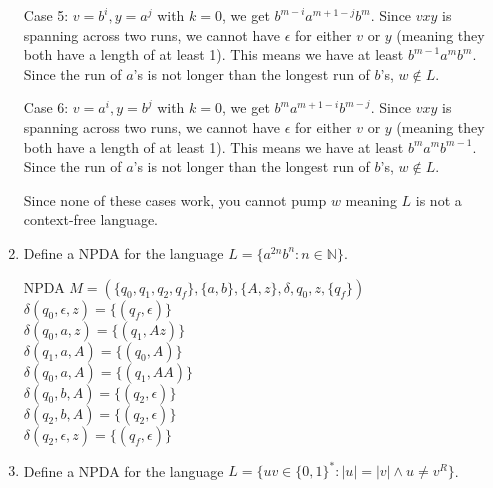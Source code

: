 \documentclass[12pt]{article}
\begin{document}
\begin{enumerate}
Case 5: $v = b^i, y = a^j$ with $k = 0$, we get $b^{m-i}a^{m+1-j}b^m$. Since $vxy$ is spanning across two runs, we cannot have $\epsilon$ for either $v$ or $y$ (meaning they both have a length of at least 1). This means we have at least $b^{m-1}a^mb^m$. Since the run of $a$'s is not longer than the longest run of $b$'s, $w \notin L$.

Case 6: $v = a^i, y = b^j$ with $k = 0$, we get $b^ma^{m+1-i}b^{m-j}$. Since $vxy$ is spanning across two runs, we cannot have $\epsilon$ for either $v$ or $y$ (meaning they both have a length of at least 1). This means we have at least $b^ma^mb^{m-1}$. Since the run of $a$'s is not longer than the longest run of $b$'s, $w \notin L$.

Since none of these cases work, you cannot pump $w$ meaning $L$ is not a context-free language. \color{black}



\item Define a NPDA for the language $L = \{a^{2n}b^n : n \in \mathbb{N}\}$.

\color{blue} NPDA $M = (\{q_0, q_1, q_2, q_f\}, \{a, b\}, \{A, z\}, \delta, q_0, z, \{q_f\})$\\
$\delta(q_0, \epsilon, z) = \{(q_f, \epsilon)\}$\\
$\delta(q_0, a, z) = \{(q_1, Az)\}$\\
$\delta(q_1, a, A) = \{(q_0, A)\}$\\
$\delta(q_0, a, A) = \{(q_1, AA)\}$\\
$\delta(q_0, b, A) = \{(q_2, \epsilon)\}$\\
$\delta(q_2, b, A) = \{(q_2, \epsilon)\}$\\
$\delta(q_2, \epsilon, z) = \{(q_f, \epsilon)\}$ \color{black}



\item Define a NPDA for the language $L = \{uv \in \{0,1\}^* : |u| = |v| \wedge u \neq v^R\}$.


\end{enumerate}
\end{document}
